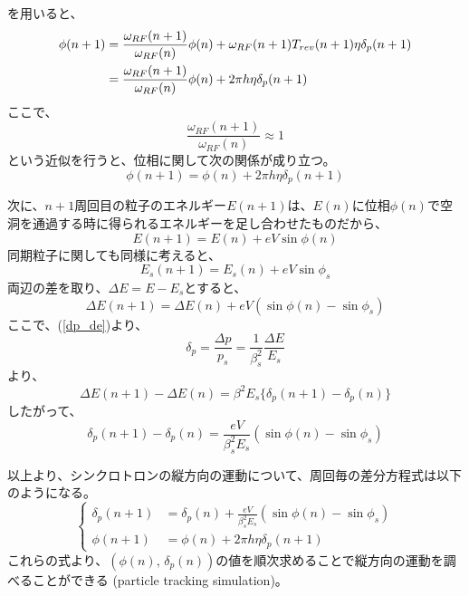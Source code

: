 \documentclass[10pt,a4paper]{jlreq}
\begin{document}
%
を用いると、
%
\begin{align}
  \phi(n+1) &= \frac{\omega_{RF}(n+1)}{\omega_{RF}(n)}\phi(n) + \omega_{RF}(n+1)T_{rev}(n+1)\eta \delta_p(n+1) \notag \\
  &=\frac{\omega_{RF}(n+1)}{\omega_{RF}(n)}\phi(n) + 2\pi h \eta \delta_p(n+1)
\end{align}
%
ここで、
%
\begin{equation}
  \frac{\omega_{RF}(n+1)}{\omega_{RF}(n)} \approx 1
\end{equation}
%
という近似を行うと、位相に関して次の関係が成り立つ。
%
\begin{equation}
  \phi(n+1) = \phi(n) + 2\pi h \eta \delta_p(n+1)
\end{equation}

次に、$n+1$周回目の粒子のエネルギー$E(n+1)$は、$E(n)$に位相$\phi(n)$で空洞を通過する時に得られるエネルギーを足し合わせたものだから、
%
\begin{equation}
  E(n+1) = E(n) + e V \sin\phi (n)
\end{equation}
%
同期粒子に関しても同様に考えると、
%
\begin{equation}
  E_s(n+1) = E_s(n) + e V \sin\phi_s
\end{equation}
%
両辺の差を取り、$\Delta E = E - E_s$とすると、
%
\begin{equation}
  \Delta E(n+1) = \Delta E(n) + e V (\sin\phi(n) - \sin\phi_s)
\end{equation}
%
ここで、(\ref{dp_de})より、
%
\begin{equation}
  \delta_p = \frac{\Delta p}{p_s} = \frac{1}{\beta_s^2}\frac{\Delta E}{E_s}
  \label{delta_p}
\end{equation}
%
より、
%
\begin{equation}
  \Delta E(n+1) - \Delta E(n) = \beta^2 E_s \{\delta_p(n+1) - \delta_p(n)\}
\end{equation}
%
したがって、
%
\begin{equation}
  \delta_p(n+1) - \delta_p(n) = \frac{e V}{\beta_s^2 E_s}(\sin\phi(n) -\sin\phi_s)
\end{equation}
%

以上より、シンクロトロンの縦方向の運動について、周回毎の差分方程式は以下のようになる。
%
\begin{equation}
  \left\{
  \begin{aligned}
    \delta_p(n+1) &= \delta_p(n) + \frac{e V}{\beta_s^2 E_s}(\sin\phi(n) -\sin\phi_s) \\
    \phi(n+1) &= \phi(n) + 2\pi h \eta \delta_p(n+1)
    \label{map}
  \end{aligned}
  \right.
\end{equation}
%
これらの式より、$(\phi(n),\,\delta_p(n))$の値を順次求めることで縦方向の運動を調べることができる (particle tracking simulation)。
\end{document}
